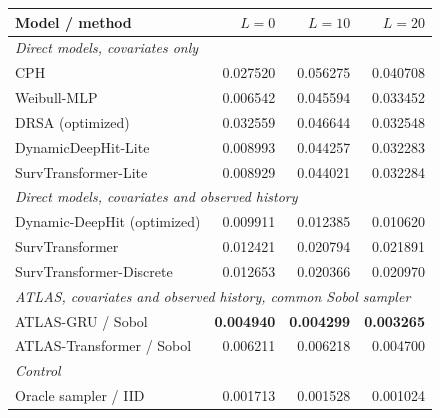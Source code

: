\begin{center}\begin{minipage}{\textwidth}\centering\small
\begin{tabular}{lrrr}
\toprule
Model / method & $L=0$ & $L=10$ & $L=20$ \\\midrule
\multicolumn{4}{l}{\textit{Direct models, covariates only}}\\
CPH & 0.027520 & 0.056275 & 0.040708 \\
Weibull-MLP & 0.006542 & 0.045594 & 0.033452 \\
DRSA (optimized) & 0.032559 & 0.046644 & 0.032548 \\
DynamicDeepHit-Lite & 0.008993 & 0.044257 & 0.032283 \\
SurvTransformer-Lite & 0.008929 & 0.044021 & 0.032284 \\
\multicolumn{4}{l}{\textit{Direct models, covariates and observed history}}\\
Dynamic-DeepHit (optimized) & 0.009911 & 0.012385 & 0.010620 \\
SurvTransformer & 0.012421 & 0.020794 & 0.021891 \\
SurvTransformer-Discrete & 0.012653 & 0.020366 & 0.020970 \\
\multicolumn{4}{l}{\textit{ATLAS, covariates and observed history, common Sobol sampler}}\\
ATLAS-GRU / Sobol & \textbf{0.004940} & \textbf{0.004299} & \textbf{0.003265} \\
ATLAS-Transformer / Sobol & 0.006211 & 0.006218 & 0.004700 \\
\multicolumn{4}{l}{\textit{Control}}\\
Oracle sampler / IID & 0.001713 & 0.001528 & 0.001024 \\
\bottomrule\end{tabular}
\label{tab:cr_cause_b}
\end{minipage}\end{center}